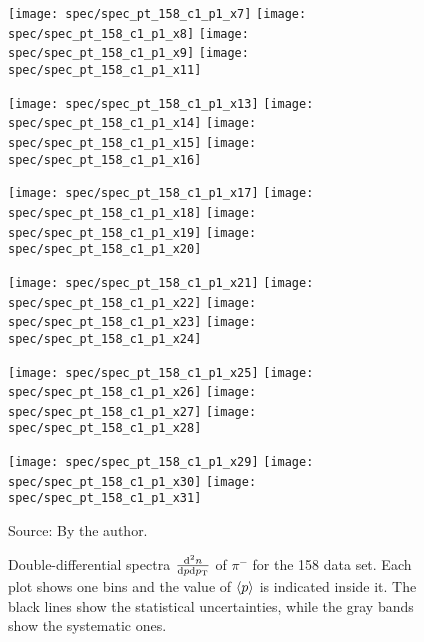 \begin{figure}[!ht]
  \centering

  \texttt{[image: spec/spec\_pt\_158\_c1\_p1\_x7]}
  \texttt{[image: spec/spec\_pt\_158\_c1\_p1\_x8]}
  \texttt{[image: spec/spec\_pt\_158\_c1\_p1\_x9]}
  \texttt{[image: spec/spec\_pt\_158\_c1\_p1\_x11]}

  \texttt{[image: spec/spec\_pt\_158\_c1\_p1\_x13]}
  \texttt{[image: spec/spec\_pt\_158\_c1\_p1\_x14]}
  \texttt{[image: spec/spec\_pt\_158\_c1\_p1\_x15]}
  \texttt{[image: spec/spec\_pt\_158\_c1\_p1\_x16]}

  \texttt{[image: spec/spec\_pt\_158\_c1\_p1\_x17]}
  \texttt{[image: spec/spec\_pt\_158\_c1\_p1\_x18]}
  \texttt{[image: spec/spec\_pt\_158\_c1\_p1\_x19]}
  \texttt{[image: spec/spec\_pt\_158\_c1\_p1\_x20]}

  \texttt{[image: spec/spec\_pt\_158\_c1\_p1\_x21]}
  \texttt{[image: spec/spec\_pt\_158\_c1\_p1\_x22]}
  \texttt{[image: spec/spec\_pt\_158\_c1\_p1\_x23]}
  \texttt{[image: spec/spec\_pt\_158\_c1\_p1\_x24]}

  \texttt{[image: spec/spec\_pt\_158\_c1\_p1\_x25]}
  \texttt{[image: spec/spec\_pt\_158\_c1\_p1\_x26]}
  \texttt{[image: spec/spec\_pt\_158\_c1\_p1\_x27]}
  \texttt{[image: spec/spec\_pt\_158\_c1\_p1\_x28]}

  \texttt{[image: spec/spec\_pt\_158\_c1\_p1\_x29]}
  \texttt{[image: spec/spec\_pt\_158\_c1\_p1\_x30]}
  \texttt{[image: spec/spec\_pt\_158\_c1\_p1\_x31]}

  \caption{Double-differential spectra $\frac{\text{d}^2n}{\text{d}p\text{d}p_\text{T}}$
    of $\pi^-$ for the 158 \GeVc data set. Each plot shows one \pp bins and the value
    of $\langle p\rangle$ is indicated inside it. The black lines show the statistical
    uncertainties, while the gray bands show the systematic ones.}
  \label{fig:hadron:spec:dedx:all158:c1p1}
  \begin{center}
    \small Source: By the author. 
  \end{center}
\end{figure}

